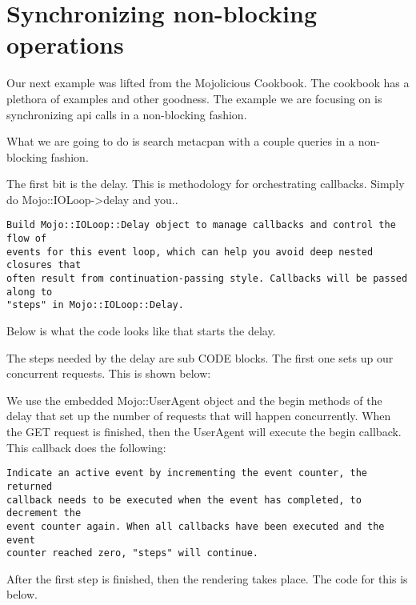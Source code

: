 \documentclass[14pt]{extreport}
\begin{document}
\section{Synchronizing non-blocking operations}

Our next example was lifted from the Mojolicious Cookbook.  The cookbook has a
plethora of examples and other goodness.  The example we are focusing on is
synchronizing api calls in a non-blocking fashion.

What we are going to do is search metacpan with a couple queries in a
non-blocking fashion.

The first bit is the delay.  This is methodology for orchestrating callbacks.  Simply do
Mojo::IOLoop->delay and you..

\begin{lstlisting}[style=BlockStyle]
Build Mojo::IOLoop::Delay object to manage callbacks and control the flow of
events for this event loop, which can help you avoid deep nested closures that
often result from continuation-passing style. Callbacks will be passed along to
"steps" in Mojo::IOLoop::Delay.
\end{lstlisting}

Below is what the code looks like that starts the delay.



The steps needed by the delay are sub CODE blocks.  The first one sets up our
concurrent requests.  This is shown below:



We use the embedded Mojo::UserAgent object and the begin methods of the delay
that set up the number of requests that will happen concurrently.  When the GET
request is finished, then the UserAgent will execute the begin callback.  This
callback does the following:

\begin{lstlisting}[style=BlockStyle]
Indicate an active event by incrementing the event counter, the returned
callback needs to be executed when the event has completed, to decrement the
event counter again. When all callbacks have been executed and the event
counter reached zero, "steps" will continue.
\end{lstlisting}

After the first step is finished, then the rendering takes place.  The code for
this is below.
\end{document}
